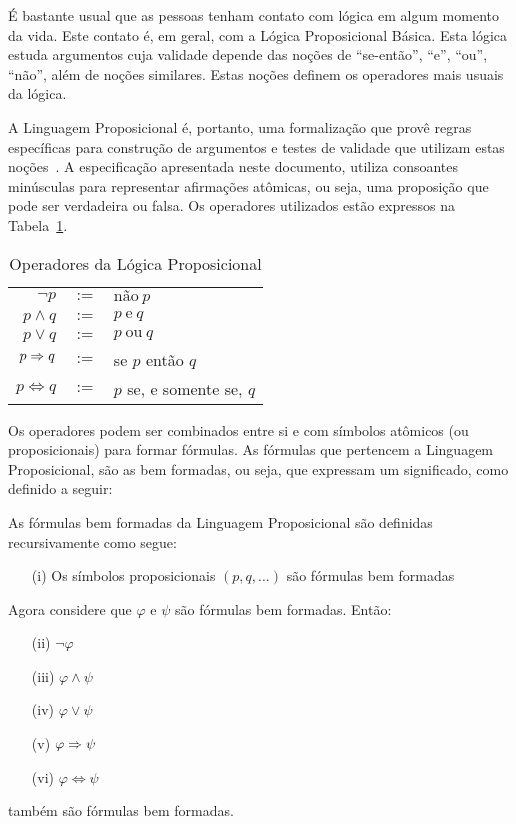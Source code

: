 É bastante usual que as pessoas tenham contato com lógica em algum momento da
vida. Este contato é, em geral, com a Lógica Proposicional Básica.
Esta lógica estuda argumentos cuja validade depende das noções de ``se-então'',
``e'', ``ou'', ``não'', além de noções similares. Estas noções definem os
operadores mais usuais da lógica. 

A Linguagem Proposicional é, portanto, uma formalização que provê regras
específicas para construção de argumentos e testes de validade que utilizam
estas noções~\cite{gensler}. A especificação apresentada neste documento,
utiliza consoantes minúsculas para representar afirmações at\^omicas, ou seja,
uma proposição que pode ser verdadeira ou falsa. Os operadores utilizados estão
expressos na Tabela~\ref{tab:operadores_prop}.

\begin{table}[!tbh]
\label{tab:operadores_prop}
\caption{Operadores da Lógica Proposicional}
\begin{center}
\begin{tabular}{|rcl|}
   \hline  
   $\neg p$ & $:=$ & $\text{não}\ p$ \\
   $p \wedge q$ & $:=$ & $p\ \text{e}\ q$ \\
   $p \vee q$ & $:=$ & $p\ \text{ou}\ q$ \\
   $p \Rightarrow q$ & $:=$ & se $p$ então $q$ \\
   $p \iff q$ & $:=$ & $p$ se, e somente se, $q$ \\
   \hline
\end{tabular}
\end{center}
\end{table}

Os operadores podem ser combinados entre si e com símbolos at\^omicos (ou
proposicionais) para formar fórmulas. As fórmulas que pertencem a Linguagem
Proposicional, são as bem formadas, ou seja, que expressam um significado, como
definido a seguir:

\begin{definition}
   As fórmulas bem formadas da Linguagem Proposicional são definidas
   recursivamente como segue:
   \begin{itemize}
       \item [(i)] Os símbolos proposicionais $(p,q,\ldots)$ são fórmulas bem formadas
   \end{itemize}
   Agora considere que $\varphi$ e $\psi$ são fórmulas bem formadas. Então:
   \begin{itemize}
       \item [(ii)] $\neg \varphi$
       \item [(iii)] $\varphi \wedge \psi$
       \item [(iv)] $\varphi \vee \psi$
       \item [(v)] $\varphi \Rightarrow \psi$
       \item [(vi)] $\varphi \iff \psi$
   \end{itemize}
   também são fórmulas bem formadas.
\end{definition}

